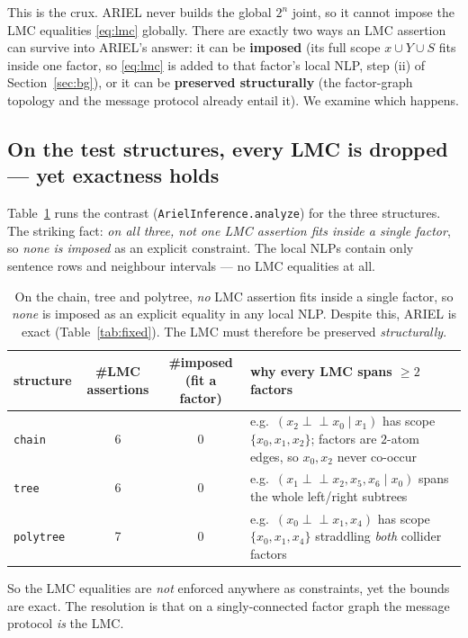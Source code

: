\documentclass[11pt]{article}
\newcommand{\indep}{\perp\!\!\!\perp}
\begin{document}
This is the crux. ARIEL never builds the global $2^n$ joint, so it cannot impose the LMC equalities
\eqref{eq:lmc} globally. There are exactly two ways an LMC assertion can survive into ARIEL's
answer: it can be \textbf{imposed} (its full scope $x\cup Y\cup S$ fits inside one factor, so
\eqref{eq:lmc} is added to that factor's local NLP, step (ii) of Section~\ref{sec:bg}), or it can be
\textbf{preserved structurally} (the factor-graph topology and the message protocol already entail
it). We examine which happens.

\subsection{On the test structures, every LMC is dropped --- yet exactness holds}
Table~\ref{tab:lmc} runs the contrast (\texttt{ArielInference.analyze}) for the three structures.
The striking fact: \emph{on all three, not one LMC assertion fits inside a single factor}, so
\emph{none is imposed} as an explicit constraint. The local NLPs contain only sentence rows and
neighbour intervals --- no LMC equalities at all.

\begin{table}[ht]\centering\small
\begin{tabular}{lccp{6.2cm}}
\toprule
structure & \#LMC assertions & \#imposed (fit a factor) & why every LMC spans $\ge2$ factors \\
\midrule
\texttt{chain}    & 6 & 0 & e.g.\ $(x_2\indep x_0\mid x_1)$ has scope $\{x_0,x_1,x_2\}$; factors are $2$-atom edges, so $x_0,x_2$ never co-occur \\
\texttt{tree}     & 6 & 0 & e.g.\ $(x_1\indep x_2,x_5,x_6\mid x_0)$ spans the whole left/right subtrees \\
\texttt{polytree} & 7 & 0 & e.g.\ $(x_0\indep x_1,x_4)$ has scope $\{x_0,x_1,x_4\}$ straddling \emph{both} collider factors \\
\bottomrule
\end{tabular}
\caption{On the chain, tree and polytree, \emph{no} LMC assertion fits inside a single factor, so
  \emph{none} is imposed as an explicit equality in any local NLP. Despite this, ARIEL is exact
  (Table~\ref{tab:fixed}). The LMC must therefore be preserved \emph{structurally}.}
\label{tab:lmc}
\end{table}

So the LMC equalities are \emph{not} enforced anywhere as constraints, yet the bounds are exact.
The resolution is that on a singly-connected factor graph the message protocol \emph{is} the LMC.
\end{document}
